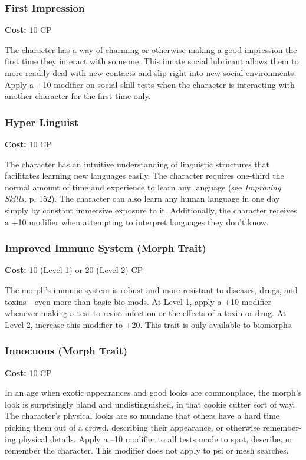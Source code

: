 \subsubsection{First Impression}

\textbf{Cost:} 10 CP

The character has a way of charming or otherwise 
making a good impression the first time they interact 
with someone. This innate social lubricant allows them 
to more readily deal with new contacts and slip right 
into new social environments. Apply a +10 modifier 
on social skill tests when the character is interacting 
with another character for the first time only.

\subsubsection{Hyper Linguist}

\textbf{Cost:} 10 CP

The character has an intuitive understanding of 
linguistic structures that facilitates learning new 
languages easily. The character requires one-third the 
normal amount of time and experience to learn any 
language (see \textit{Improving Skills,} p. 152). The character 
can also learn any human language in one day simply 
by constant immersive exposure to it. Additionally, 
the character receives a +10 modifier when attempting 
to interpret languages they don't know.

\subsubsection{Improved Immune System (Morph Trait)}

\textbf{Cost:} 10 (Level 1) or 20 (Level 2) CP

The morph's immune system is robust and more 
resistant to diseases, drugs, and toxins—even more 
than basic bio-mods. At Level 1, apply a +10 modifier 
whenever making a test to resist infection or the effects 
of a toxin or drug. At Level 2, increase this modifier to 
+20. This trait is only available to biomorphs.

\subsubsection{Innocuous (Morph Trait)}

\textbf{Cost:} 10 CP

In an age when exotic appearances and good looks 
are commonplace, the morph's look is surprisingly 
bland and undistinguished, in that cookie cutter sort of 
way. The character's physical looks are so mundane that 
others have a hard time picking them out of a crowd, 
describing their appearance, or otherwise remember-
ing physical details. Apply a –10 modifier to all tests 
made to spot, describe, or remember the character. This 
modifier does not apply to psi or mesh searches.

